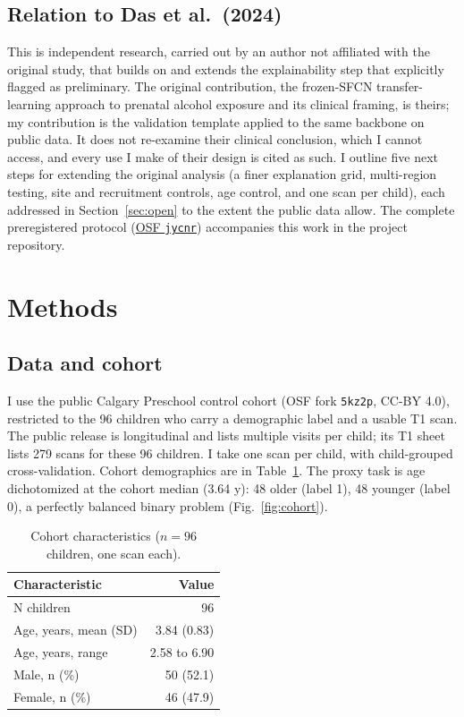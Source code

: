 \documentclass[11pt]{article}
\begin{document}
\subsection{Relation to Das et al.\ (2024)}
This is independent research, carried out by an author not affiliated with the original
study, that builds on and extends the explainability step that \citet{das2024} explicitly
flagged as preliminary. The original contribution, the frozen-SFCN transfer-learning
approach to prenatal alcohol exposure and its clinical framing, is theirs; my contribution
is the validation template applied to the same backbone on public data. It does not re-examine
their clinical conclusion, which I cannot access, and every use I make of their design is
cited as such. I
outline five next steps for extending the original analysis (a finer explanation grid,
multi-region testing, site and recruitment controls, age control, and one scan per child),
each addressed in Section~\ref{sec:open} to the extent the public data allow. The complete preregistered protocol (\href{https://osf.io/jycnr}{OSF \texttt{jycnr}}) accompanies this work in the project repository.

\section{Methods}

\subsection{Data and cohort}
I use the public Calgary Preschool control cohort \citep{reynolds2020} (OSF fork
\texttt{5kz2p}, CC-BY 4.0), restricted to the 96 children who carry a demographic label and a
usable T1 scan. The public release is longitudinal and lists multiple
visits per child; its T1 sheet lists 279 scans for these 96 children. I take one scan per
child, with child-grouped cross-validation. Cohort
demographics are in Table~\ref{tab:cohort}. The proxy task is age dichotomized at the cohort
median (3.64 y): 48 older (label 1), 48 younger (label 0), a perfectly balanced
binary problem (Fig.~\ref{fig:cohort}).

\begin{table}[H]
\centering
\caption{Cohort characteristics ($n=96$ children, one scan each).}
\label{tab:cohort}
\begin{tabular}{lr}
\toprule
Characteristic & Value \\
\midrule
N children & 96 \\
Age, years, mean (SD) & 3.84 (0.83) \\
Age, years, range & 2.58 to 6.90 \\
Male, n (\%) & 50 (52.1) \\
Female, n (\%) & 46 (47.9) \\
\bottomrule
\end{tabular}
\end{table}
\end{document}
